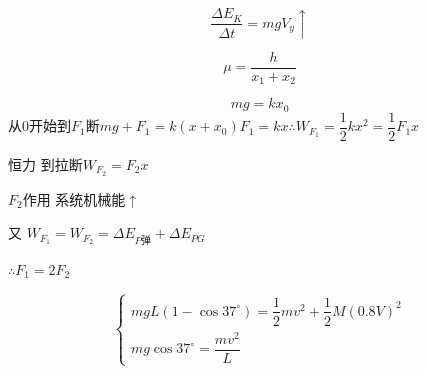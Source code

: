 \begin{problem}
\begin{solution}
\[ \frac{\Delta E_K}{\Delta t}=mgV_y\uparrow \]
\end{solution}
\end{problem}
\[ \mu=\frac{h}{x_1+x_2} \]
\begin{problem}
\begin{solution}
\[ mg=kx_0 \]
从0开始到$F_1$断\quad $mg+F_1=k(x+x_0)$\quad $F_1=kx$\quad $\therefore W_{F_1}=\dfrac12kx^2=\dfrac12F_1x$

恒力 到拉断\quad $W_{F_2}=F_2x$

$F_2$作用 系统机械能$\uparrow$

又 $W_{F_1}=W_{F_2}=\Delta E_{P\text{弹}}+\Delta E_{PG}$

$\therefore F_1=2F_2$
\end{solution}
\end{problem}
\[
\begin{cases}
mgL(1-\cos37^\circ)=\dfrac12mv^2+\dfrac12M(0.8V)^2\\[4pt]
mg\cos37^\circ=\dfrac{mv^2}{L}
\end{cases}
\]
